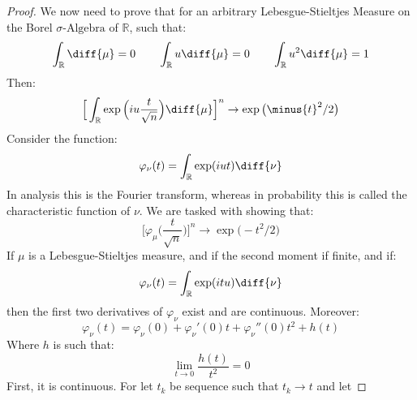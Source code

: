 \begin{proof}
            We now need to prove that for an arbitrary
            Lebesgue-Stieltjes Measure on the Borel
            $\sigma\textrm{-Algebra}$ of $\mathbb{R}$,
            such that:
            \begin{equation}
                \int_{\mathbb{R}}\diff{\mu}=0\quad\quad
                \int_{\mathbb{R}}u\diff{\mu}=0\quad\quad
                \int_{\mathbb{R}}u^{2}\diff{\mu}=1
            \end{equation}
            Then:
            \begin{equation}
                \Big[\int_{\mathbb{R}}\exp\Big(
                    iu\frac{t}{\sqrt{n}}\Big)\diff{\mu}\Big]^{n}
                \rightarrow\exp\big(\minus{t}^{2}/2\big)
            \end{equation}
            Consider the function:
            \begin{equation}
                \varphi_{\nu}(t)=
                \int_{\mathbb{R}}\exp(iut)\diff{\nu}
            \end{equation}
            In analysis this is the Fourier transform,
            whereas in probability this is called the
            characteristic function of $\nu$. We are
            tasked with showing that:
            \begin{equation}
                \Big[\varphi_{\mu}
                    \big(\frac{t}{\sqrt{n}}\big)\Big]^{n}
                \rightarrow\exp\big(\minus{t}^{2}/2\big)
            \end{equation}
            If $\mu$ is a Lebesgue-Stieltjes measure, and
            if the second moment if finite, and if:
            \begin{equation}
                \varphi_{\nu}(t)=
                \int_{\mathbb{R}}\exp(itu)\diff{\nu}
            \end{equation}
            then the first two derivatives of $\varphi_{\nu}$
            exist and are continuous. Moreover:
            \begin{equation}
                \varphi_{\nu}(t)=
                \varphi_{\nu}(0)+
                \varphi_{\nu}'(0)t+
                \varphi_{\nu}''(0)t^{2}+h(t)
            \end{equation}
            Where $h$ is such that:
            \begin{equation}
                \underset{t\rightarrow{0}}{\lim}
                \frac{h(t)}{t^{2}}=0
            \end{equation}
            First, it is continuous. For let $t_{k}$ be
            sequence such that $t_{k}\rightarrow{t}$ and let

\end{proof}
